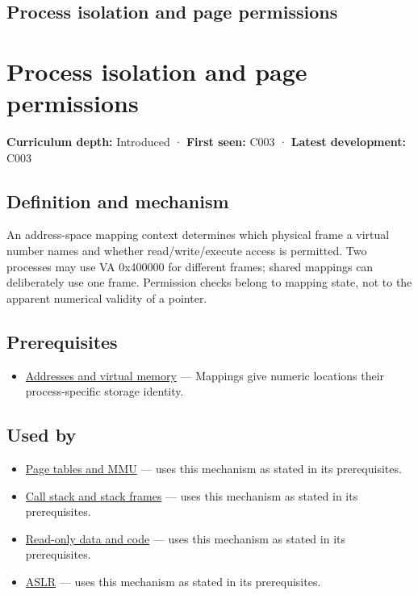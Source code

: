 \hypertarget{appendix-c2a9ad1e2b49}{}
\section*{Process isolation and page permissions}
\chapter{Process isolation and page permissions}\label{appendix-c2a9ad1e2b49-process-isolation-and-page-permissions}

\textbf{Curriculum depth:} Introduced · \textbf{First seen:} C003 · \textbf{Latest development:} C003

\section{Definition and mechanism}\label{appendix-c2a9ad1e2b49-definition-and-mechanism}

An address-space mapping context determines which physical frame a virtual number names and whether read/write/execute access is permitted. Two processes may use VA 0x400000 for different frames; shared mappings can deliberately use one frame. Permission checks belong to mapping state, not to the apparent numerical validity of a pointer.

\section{Prerequisites}\label{appendix-c2a9ad1e2b49-prerequisites}

\begin{itemize}
\tightlist
\item
  \hyperref[appendix-18ee4f913c3c]{Addresses and virtual memory} --- Mappings give numeric locations their process-specific storage identity.
\end{itemize}

\section{Used by}\label{appendix-c2a9ad1e2b49-used-by}

\begin{itemize}
\tightlist
\item
  \hyperref[appendix-01e5905165c4]{Page tables and MMU} --- uses this mechanism as stated in its prerequisites.
\item
  \hyperref[appendix-b081b7abe193]{Call stack and stack frames} --- uses this mechanism as stated in its prerequisites.
\item
  \hyperref[appendix-5f9e5e2f0a5e]{Read-only data and code} --- uses this mechanism as stated in its prerequisites.
\item
  \hyperref[appendix-78cb248c8355]{ASLR} --- uses this mechanism as stated in its prerequisites.
\end{itemize}

